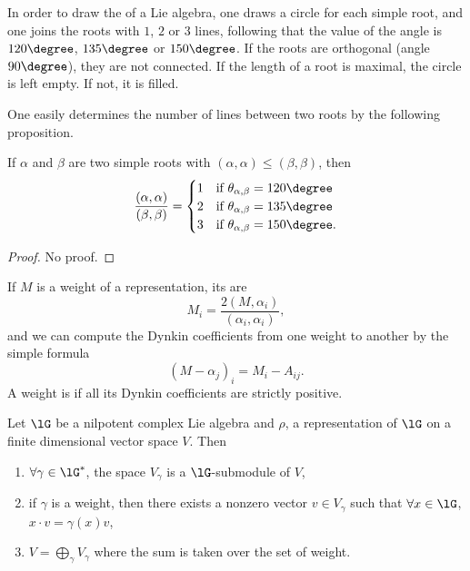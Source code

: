 In order to draw the  of a Lie algebra, one draws a circle for each simple root, and one joins the roots with $1$, $2$ or $3$ lines, following that the value of the angle is $120\degree$, $135\degree$ or $150\degree$. If the roots are orthogonal (angle $90\degree$), they are not connected. If the length of a root is maximal, the circle is left empty. If not, it is filled.

One easily determines the number of lines between two roots by the following proposition.
\begin{proposition}         \label{PropProdNbLignes}
    If $\alpha$ and $\beta$ are two simple roots with $(\alpha,\alpha)\leq(\beta,\beta)$, then
    \begin{equation}
        \frac{ (\alpha,\alpha) }{ (\beta,\beta) }=
    \begin{cases}
        1   &\text{if $\theta_{\alpha,\beta}=120\degree$}\\
        2   &\text{if $\theta_{\alpha,\beta}=135\degree$}\\
        3   &\text{if $\theta_{\alpha,\beta}=150\degree$}.
    \end{cases}
    \end{equation}
\end{proposition}
\begin{proof}
    No proof.
\end{proof}

If $M$ is a weight of a representation, its  are
\begin{equation}
    M_i=\frac{ 2(M,\alpha_i) }{ (\alpha_i,\alpha_i) },
\end{equation}
and we can compute the Dynkin coefficients from one weight to another by the simple formula
\begin{equation}        \label{EqCofDynMmoisAlpha}
    (M-\alpha_j)_i=M_i-A_{ij}.
\end{equation}
A weight is  if all its Dynkin coefficients are strictly positive.

\begin{proposition}\label{prop:trois_poids}
    Let $\lG$ be a nilpotent complex Lie algebra and $\rho$, a representation of $\lG$ on a finite dimensional vector space $V$. Then
    \begin{enumerate}
        \item $\forall \gamma\in\lG^*$, the space $V_{\gamma}$ is a $\lG$-submodule of $V$,
        \item if $\gamma$ is a weight, then there exists a nonzero vector $v\in V_{\gamma}$ such that $\forall x\in\lG$, $x\cdot v=\gamma(x)v$,
        \label{prop:trois_poids:deux}
        \item\label{ItemVSEZlhviii} $V=\bigoplus_{\gamma}V_{\gamma}$ where the sum is taken over the set of weight.
    \end{enumerate}
\end{proposition}

